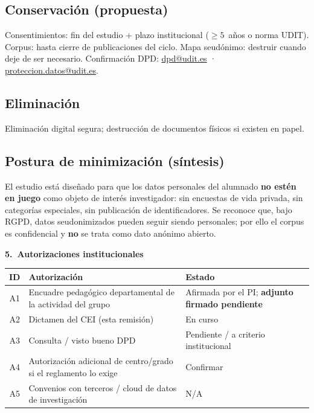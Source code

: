 \documentclass[11pt,a4paper]{scrartcl}
\newcommand{\AnnexTitle}[1]{%
  \clearpage
  \LogoRow
  \begin{center}{\Large\sffamily\bfseries #1}\end{center}
  \vspace{0.4em}
  \noindent{\color{rulegray}\hrule height 0.4pt}
  \vspace{0.5em}
}
\begin{document}
\subsection*{Conservación (propuesta)}
Consentimientos: fin del estudio + plazo institucional ($\geq 5$~años o norma UDIT).
Corpus: hasta cierre de publicaciones del ciclo. Mapa seudónimo: destruir cuando
deje de ser necesario. Confirmación DPD:
\href{mailto:dpd@udit.es}{dpd@udit.es} ·
\href{mailto:proteccion.datos@udit.es}{proteccion.datos@udit.es}.

\subsection*{Eliminación}
Eliminación digital segura; destrucción de documentos físicos si existen en papel.

\subsection*{Postura de minimización (síntesis)}
El estudio está diseñado para que los datos personales del alumnado \textbf{no
estén en juego} como objeto de interés investigador: sin encuestas de vida privada,
sin categorías especiales, sin publicación de identificadores. Se reconoce que, bajo
RGPD, datos seudonimizados pueden seguir siendo personales; por ello el corpus
es confidencial y \textbf{no} se trata como dato anónimo abierto.

\AnnexTitle{5.\ Autorizaciones institucionales}

\renewcommand{\arraystretch}{1.25}
\begin{tabularx}{\textwidth}{@{}c>{\raggedright\arraybackslash}X>{\raggedright\arraybackslash}p{3.4cm}@{}}
  \toprule
  \textbf{ID} & \textbf{Autorización} & \textbf{Estado} \\
  \midrule
  A1 & Encuadre pedagógico departamental de la actividad del grupo & Afirmada por el PI; \textbf{adjunto firmado pendiente} \\
  A2 & Dictamen del CEI (esta remisión) & En curso \\
  A3 & Consulta / visto bueno DPD & Pendiente / a criterio institucional \\
  A4 & Autorización adicional de centro/grado si el reglamento lo exige & Confirmar \\
  A5 & Convenios con terceros / cloud de datos de investigación & N/A \\
  \bottomrule
\end{tabularx}
\end{document}
